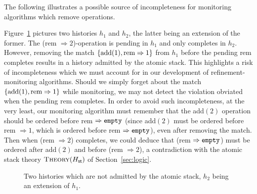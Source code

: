 The following illustrates a possible source of incompleteness for monitoring
algorithms which remove operations.

\begin{example}
  \label{ex:removal_no_saturation}

  Figure~\ref{fig:removal_no_saturation} pictures two histories $h_1$ and
  $h_2$, the latter being an extension of the former. The (\textnormal{rem} $\Rightarrow
  2$)-operation is pending in $h_1$ and only completes in $h_2$. However,
  removing the match ${\{  \textnormal{add}(1), \textnormal{rem}\Rightarrow 1  \}}$ from $h_1$
  before the pending \textnormal{rem} completes results in a history admitted by the
  atomic stack. This highlights a risk of incompleteness which we must account
  for in our development of refinement-monitoring algorithms. Should we simply
  forget about the match ${\{  \textnormal{add}(1), \textnormal{rem} \Rightarrow 1 \}}$ while
  monitoring, we may not detect the violation obviated when the pending
  \textnormal{rem} completes. In order to avoid such incompleteness, at the very least,
  our monitoring algorithm must remember that the \textnormal{add}$(2)$ operation
  should be ordered before \textnormal{rem} $\Rightarrow {\tt empty}$ (since
  \textnormal{add}$(2)$ must be ordered before \textnormal{rem} $\Rightarrow 1$, which is ordered before
  \textnormal{rem} $\Rightarrow {\tt empty}$), even after removing the match. Then
  when (\textnormal{rem} $\Rightarrow 2$) completes, we could deduce that (\textnormal{rem}
  $\Rightarrow {\tt empty}$) must be ordered after \textnormal{add}$(2)$ and before (\textnormal{rem}
  $\Rightarrow 2$), a contradiction with the atomic stack theory
  $\textsc{Theory}(H_{\sf st})$ of Section~\ref{sec:logic}.

\end{example}

\begin{figure}
  
  \caption{Two histories which are not admitted by the atomic stack, $h_2$
  being an extension of $h_1$.}
  \label{fig:removal_no_saturation}
\end{figure}

